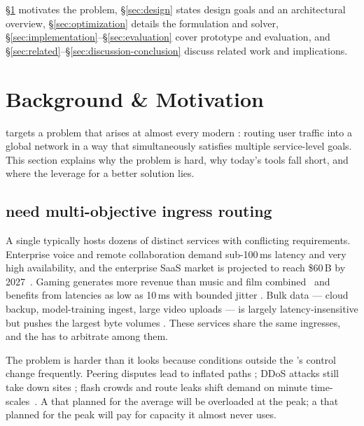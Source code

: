 \documentclass[acmsmall,anonymous,review,nonacm,10pt]{acmart}
\begin{document}
  \S\ref{sec:motivation} motivates the problem,
\S\ref{sec:design} states design goals and an architectural
overview, \S\ref{sec:optimization} details the formulation and
solver, \S\ref{sec:implementation}--\S\ref{sec:evaluation} cover
prototype and evaluation, and
\S\ref{sec:related}--\S\ref{sec:discussion-conclusion} discuss
related work and implications.

\section{Background \& Motivation}
\label{sec:motivation}

\sparse targets a problem that arises at almost every modern
\servprod: routing user traffic into a global network in a way that
simultaneously satisfies multiple service-level goals.  This
section explains why the problem is hard, why today's tools fall
short, and where the leverage for a better solution lies.

\subsection{\servprods need multi-objective ingress routing}
\label{sec:motivation-multi-objective}

A single \servprod typically hosts dozens of distinct services
with conflicting requirements.  Enterprise voice and remote
collaboration demand sub-100\,ms latency and very high availability,
and the enterprise SaaS market is projected to reach \$60\,B by
2027~\cite{naas-market-growth}.  Gaming generates more revenue
than music and film combined~\cite{forbes-gaming} and benefits
from latencies as low as 10\,ms with bounded jitter
\cite{latency-shears,vr-jitter-test}.  Bulk data --- cloud backup,
model-training ingest, large video uploads --- is largely
latency-insensitive but pushes the largest byte volumes
\cite{google-cloud-video-ai,microsoft-cloud-video-ai}.  These
services share the same ingresses, and the \servprod has to
arbitrate among them.

The problem is harder than it looks because conditions outside the
\servprod's control change frequently.  Peering disputes lead to
inflated paths
\cite{fastroute,netflix-squid-game-dispute,dhamdhere2018inferring};
DDoS attacks still take down sites
\cite{increasing-ddos-siliconangle,dike-breaks-ddos,spamhaus-ddos,github-ddos-attack};
flash crowds and route leaks shift demand on minute
time-scales~\cite{livenet,dote,taiji,lockdown-flash-crowd,fortnite-flash-crowd,bloomberg-verizon-change,route-leak-russia,hamas-fiber-cut,microsoft-cloud-outage-march24}.
A \servprod that planned for the average will be overloaded at the
peak; a \servprod that planned for the peak will pay for capacity
it almost never uses.
\end{document}
